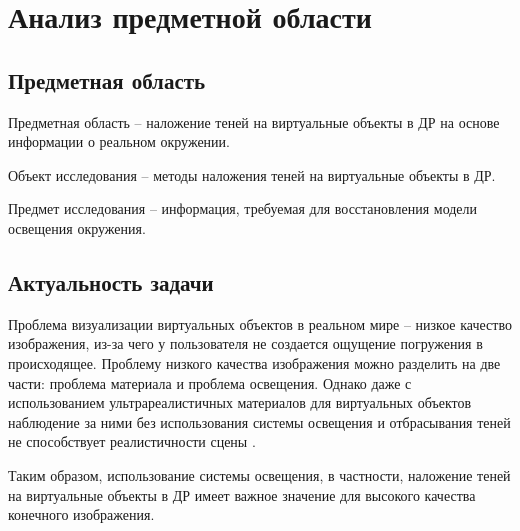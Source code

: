 \chapter{Анализ предметной области}

\section{Предметная область}

Предметная область -- наложение теней  на виртуальные объекты в ДР на основе информации о реальном окружении.

Объект исследования -- методы наложения теней  на виртуальные объекты в ДР.

Предмет исследования -- информация, требуемая для восстановления модели освещения окружения.

\section{Актуальность задачи}

Проблема визуализации виртуальных объектов в реальном мире -- низкое качество изображения, из-за чего у пользователя не создается ощущение погружения в происходящее. Проблему низкого качества изображения можно разделить на две части: проблема материала и проблема освещения. Однако даже с использованием ультрареалистичных материалов для виртуальных объектов наблюдение за ними без использования системы освещения и отбрасывания теней не способствует реалистичности сцены \cite{osti2019real}.

Таким образом, использование системы освещения, в частности, наложение теней на виртуальные объекты в ДР имеет важное значение для высокого качества конечного изображения.

